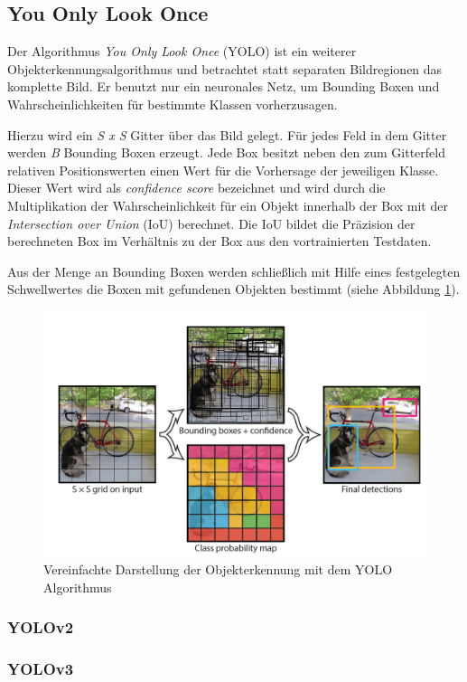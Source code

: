 \subsection{You Only Look Once}

Der Algorithmus \textit{You Only Look Once} (YOLO) ist ein weiterer Objekterkennungsalgorithmus und betrachtet statt separaten Bildregionen das komplette Bild. Er benutzt nur ein neuronales Netz, um Bounding Boxen und Wahrscheinlichkeiten für bestimmte Klassen vorherzusagen.

Hierzu wird ein \textit{S x S} Gitter über das Bild gelegt. Für jedes Feld in dem Gitter werden \textit{B} Bounding Boxen erzeugt. Jede Box besitzt neben den zum Gitterfeld relativen Positionswerten einen Wert für die Vorhersage der jeweiligen Klasse. Dieser Wert wird als \textit{confidence score} bezeichnet und wird durch die Multiplikation der Wahrscheinlichkeit für ein Objekt innerhalb der Box mit der \textit{Intersection over Union} (IoU) berechnet. Die IoU bildet die Präzision der berechneten Box im Verhältnis zu der Box aus den vortrainierten Testdaten. \cite[S. 2]{JosephRedmon.2016} 

Aus der Menge an Bounding Boxen werden schließlich mit Hilfe eines festgelegten Schwellwertes die Boxen mit gefundenen Objekten bestimmt (siehe Abbildung \ref{yolo_model}).

\begin{figure}[ht]
	\begin{center}
		\includegraphics[width=12cm]{Bilder/yolo_model.png} 
		\caption{Vereinfachte Darstellung der Objekterkennung mit dem YOLO Algorithmus \cite[S. 2]{JosephRedmon.2016}}
		\label{yolo_model}
	\end{center}
\end{figure}

\subsubsection{YOLOv2}

\subsubsection{YOLOv3}




